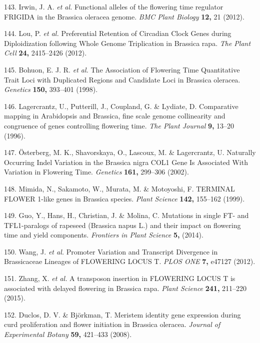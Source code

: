 \documentclass[12pt,]{book}
\begin{document}
\hypertarget{ref-irwin_functional_2012}{}
143. Irwin, J. A. \emph{et al.} Functional alleles of the flowering time
regulator FRIGIDA in the Brassica oleracea genome. \emph{BMC Plant
Biology} \textbf{12,} 21 (2012).

\hypertarget{ref-lou_preferential_2012}{}
144. Lou, P. \emph{et al.} Preferential Retention of Circadian Clock
Genes during Diploidization following Whole Genome Triplication in
Brassica rapa. \emph{The Plant Cell} \textbf{24,} 2415--2426 (2012).

\hypertarget{ref-bohuon_association_1998}{}
145. Bohuon, E. J. R. \emph{et al.} The Association of Flowering Time
Quantitative Trait Loci with Duplicated Regions and Candidate Loci in
Brassica oleracea. \emph{Genetics} \textbf{150,} 393--401 (1998).

\hypertarget{ref-lagercrantz_comparative_1996}{}
146. Lagercrantz, U., Putterill, J., Coupland, G. \& Lydiate, D.
Comparative mapping in Arabidopsis and Brassica, fine scale genome
collinearity and congruence of genes controlling flowering time.
\emph{The Plant Journal} \textbf{9,} 13--20 (1996).

\hypertarget{ref-osterberg_naturally_2002}{}
147. Österberg, M. K., Shavorskaya, O., Lascoux, M. \& Lagercrantz, U.
Naturally Occurring Indel Variation in the Brassica nigra COL1 Gene Is
Associated With Variation in Flowering Time. \emph{Genetics}
\textbf{161,} 299--306 (2002).

\hypertarget{ref-mimida_terminal_1999}{}
148. Mimida, N., Sakamoto, W., Murata, M. \& Motoyoshi, F. TERMINAL
FLOWER 1-like genes in Brassica species. \emph{Plant Science}
\textbf{142,} 155--162 (1999).

\hypertarget{ref-guo_mutations_2014}{}
149. Guo, Y., Hans, H., Christian, J. \& Molina, C. Mutations in single
FT- and TFL1-paralogs of rapeseed (Brassica napus L.) and their impact
on flowering time and yield components. \emph{Frontiers in Plant
Science} \textbf{5,} (2014).

\hypertarget{ref-wang_promoter_2012}{}
150. Wang, J. \emph{et al.} Promoter Variation and Transcript Divergence
in Brassicaceae Lineages of FLOWERING LOCUS T. \emph{PLOS ONE}
\textbf{7,} e47127 (2012).

\hypertarget{ref-zhang_transposon_2015}{}
151. Zhang, X. \emph{et al.} A transposon insertion in FLOWERING LOCUS T
is associated with delayed flowering in Brassica rapa. \emph{Plant
Science} \textbf{241,} 211--220 (2015).

\hypertarget{ref-duclos_meristem_2008}{}
152. Duclos, D. V. \& Björkman, T. Meristem identity gene expression
during curd proliferation and flower initiation in Brassica oleracea.
\emph{Journal of Experimental Botany} \textbf{59,} 421--433 (2008).
\end{document}
